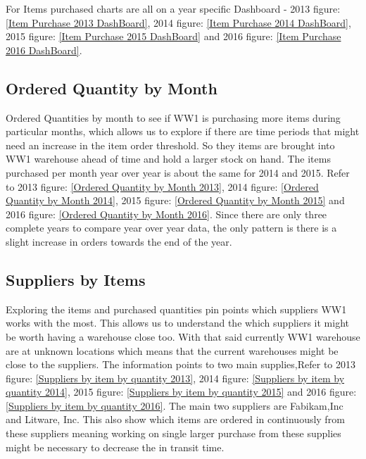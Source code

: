\documentclass[12pt]{article}
\begin{document}
\begin{flushleft}
    For Items purchased charts are all on a year specific Dashboard - 2013 figure: \ref{Item Purchase 2013 DashBoard}, 2014 figure: \ref{Item Purchase 2014 DashBoard}, 2015 figure: \ref{Item Purchase 2015 DashBoard} and 2016 figure: \ref{Item Purchase 2016 DashBoard}.
\end{flushleft}

\subsection{Ordered Quantity by Month}
\begin{flushleft}
Ordered Quantities by month to see if WW1 is purchasing more items during particular months, which allows us to explore if there are time periods that might need an increase in the item order threshold. So they items are brought into WW1 warehouse ahead of time and hold a larger stock on hand. The items purchased per month year over year is about the same for 2014 and 2015. Refer to 2013 figure: \ref{Ordered Quantity by Month 2013}, 2014 figure: \ref{Ordered Quantity by Month 2014}, 2015 figure: \ref{Ordered Quantity by Month 2015} and 2016 figure: \ref{Ordered Quantity by Month 2016}. Since there are only three complete years to compare year over year data, the only pattern is there is a slight increase in orders towards the end of the year.

\end{flushleft}

\subsection{Suppliers by Items}
\begin{flushleft}
Exploring the items and purchased quantities pin points which suppliers WW1 works with the most. This allows us to understand the which suppliers it might be worth having a warehouse close too. With that said currently WW1 warehouse are at unknown locations which means that the current warehouses might be close to the suppliers. The information points to two main supplies,Refer to 2013 figure: \ref{Suppliers by item by quantity 2013}, 2014 figure: \ref{Suppliers by item by quantity 2014}, 2015 figure: \ref{Suppliers by item by quantity 2015} and 2016 figure: \ref{Suppliers by item by quantity 2016}. The main two suppliers are Fabikam,Inc and Litware, Inc. This also show which items are ordered in continuously from these suppliers meaning working on single larger purchase from these supplies might be necessary  to decrease the in transit time.
\end{flushleft}
\end{document}
